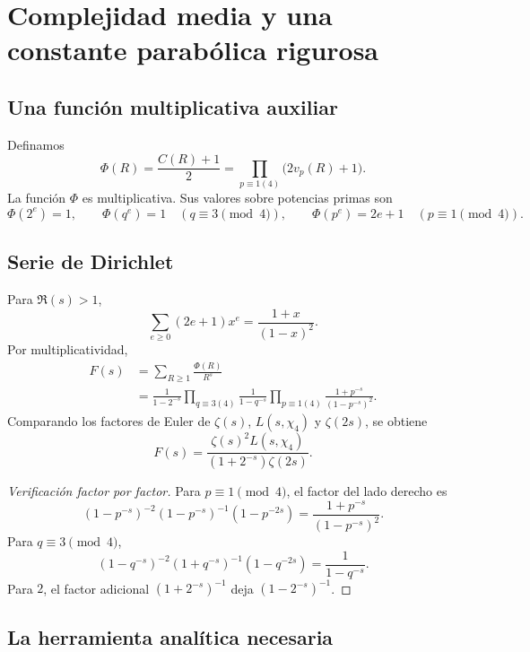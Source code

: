 \documentclass[11pt,a4paper,openany]{report}
\begin{document}
\chapter{Complejidad media y una constante parabólica rigurosa}

\section{Una función multiplicativa auxiliar}

Definamos
\begin{equation}
 \Phi(R)=\frac{C(R)+1}{2}
 =\prod_{p\equiv1(4)}\bigl(2v_p(R)+1\bigr).
 \label{eq:Phi}
\end{equation}
La función \(\Phi\) es multiplicativa. Sus valores sobre potencias primas son
\[
 \Phi(2^e)=1,
 \qquad
 \Phi(q^e)=1\quad(q\equiv3\pmod4),
 \qquad
 \Phi(p^e)=2e+1\quad(p\equiv1\pmod4).
\]

\section{Serie de Dirichlet}

Para \(\Re(s)>1\),
\[
 \sum_{e\ge0}(2e+1)x^e=\frac{1+x}{(1-x)^2}.
\]
Por multiplicatividad,
\begin{align}
 F(s)
 &=\sum_{R\ge1}\frac{\Phi(R)}{R^s}\\
 &=\frac1{1-2^{-s}}
 \prod_{q\equiv3(4)}\frac1{1-q^{-s}}
 \prod_{p\equiv1(4)}\frac{1+p^{-s}}{(1-p^{-s})^2}.
 \label{eq:F-euler}
\end{align}
Comparando los factores de Euler de \(\zeta(s)\), \(L(s,\chi_4)\) y \(\zeta(2s)\), se obtiene
\begin{equation}
 \boxed{
 F(s)=\frac{\zeta(s)^2L(s,\chi_4)}{(1+2^{-s})\zeta(2s)}.}
 \label{eq:Dirichlet-Phi}
\end{equation}

\begin{proof}[Verificación factor por factor]
Para \(p\equiv1\pmod4\), el factor del lado derecho es
\[
 (1-p^{-s})^{-2}(1-p^{-s})^{-1}(1-p^{-2s})
 =\frac{1+p^{-s}}{(1-p^{-s})^2}.
\]
Para \(q\equiv3\pmod4\),
\[
 (1-q^{-s})^{-2}(1+q^{-s})^{-1}(1-q^{-2s})
 =\frac1{1-q^{-s}}.
\]
Para \(2\), el factor adicional \((1+2^{-s})^{-1}\) deja \((1-2^{-s})^{-1}\).
\end{proof}

\section{La herramienta analítica necesaria}
\end{document}
